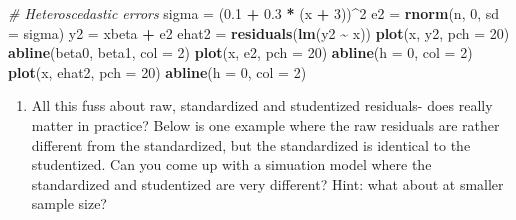 \documentclass[
]{article}
\newenvironment{Shaded}{\begin{snugshade}}{\end{snugshade}}
\newcommand{\AttributeTok}[1]{\textcolor[rgb]{0.13,0.29,0.53}{#1}}
\newcommand{\CommentTok}[1]{\textcolor[rgb]{0.56,0.35,0.01}{\textit{#1}}}
\newcommand{\DecValTok}[1]{\textcolor[rgb]{0.00,0.00,0.81}{#1}}
\newcommand{\FloatTok}[1]{\textcolor[rgb]{0.00,0.00,0.81}{#1}}
\newcommand{\FunctionTok}[1]{\textcolor[rgb]{0.13,0.29,0.53}{\textbf{#1}}}
\newcommand{\NormalTok}[1]{#1}
\newcommand{\OtherTok}[1]{\textcolor[rgb]{0.56,0.35,0.01}{#1}}
\newcommand{\SpecialCharTok}[1]{\textcolor[rgb]{0.81,0.36,0.00}{\textbf{#1}}}
\providecommand{\tightlist}{%
  \setlength{\itemsep}{0pt}\setlength{\parskip}{0pt}}
\begin{document}
\begin{Shaded}
\begin{Highlighting}[]
\CommentTok{\# Heteroscedastic errors}
\NormalTok{sigma }\OtherTok{=}\NormalTok{ (}\FloatTok{0.1} \SpecialCharTok{+} \FloatTok{0.3} \SpecialCharTok{*}\NormalTok{ (x }\SpecialCharTok{+} \DecValTok{3}\NormalTok{))}\SpecialCharTok{\^{}}\DecValTok{2}
\NormalTok{e2 }\OtherTok{=} \FunctionTok{rnorm}\NormalTok{(n, }\DecValTok{0}\NormalTok{, }\AttributeTok{sd =}\NormalTok{ sigma)}
\NormalTok{y2 }\OtherTok{=}\NormalTok{ xbeta }\SpecialCharTok{+}\NormalTok{ e2}
\NormalTok{ehat2 }\OtherTok{=} \FunctionTok{residuals}\NormalTok{(}\FunctionTok{lm}\NormalTok{(y2 }\SpecialCharTok{\textasciitilde{}}\NormalTok{ x))}
\FunctionTok{plot}\NormalTok{(x, y2, }\AttributeTok{pch =} \DecValTok{20}\NormalTok{)}
\FunctionTok{abline}\NormalTok{(beta0, beta1, }\AttributeTok{col =} \DecValTok{2}\NormalTok{)}
\FunctionTok{plot}\NormalTok{(x, e2, }\AttributeTok{pch =} \DecValTok{20}\NormalTok{)}
\FunctionTok{abline}\NormalTok{(}\AttributeTok{h =} \DecValTok{0}\NormalTok{, }\AttributeTok{col =} \DecValTok{2}\NormalTok{)}
\FunctionTok{plot}\NormalTok{(x, ehat2, }\AttributeTok{pch =} \DecValTok{20}\NormalTok{)}
\FunctionTok{abline}\NormalTok{(}\AttributeTok{h =} \DecValTok{0}\NormalTok{, }\AttributeTok{col =} \DecValTok{2}\NormalTok{)}
\end{Highlighting}
\end{Shaded}

\begin{enumerate}
\def\labelenumi{\arabic{enumi}.}
\setcounter{enumi}{1}
\tightlist
\item
  All this fuss about raw, standardized and studentized residuals- does
  really matter in practice? Below is one example where the raw
  residuals are rather different from the standardized, but the
  standardized is identical to the studentized. Can you come up with a
  simuation model where the standardized and studentized are very
  different? Hint: what about at smaller sample size?
\end{enumerate}
\end{document}

